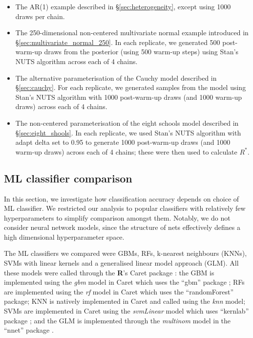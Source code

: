 \documentclass[ba]{imsart}
\numberwithin{equation}{section}
\theoremstyle{plain}
\begin{document}
\begin{supplement}
		\begin{itemize}
			\item The AR(1) example described in \S\ref{sec:heterogeneity}, except using 1000 draws per chain.
			\item The 250-dimensional non-centered multivariate normal example introduced in \S\ref{sec:multivariate_normal_250}. In each replicate, we generated 500 post-warm-up draws from the posterior (using 500 warm-up steps) using Stan's NUTS algorithm across each of 4 chains.
			\item The alternative parameterisation of the Cauchy model described in \S\ref{sec:cauchy}. For each replicate, we generated samples from the model using Stan's NUTS algorithm with 1000 post-warm-up draws (and 1000 warm-up draws) across each of 4 chains.
			\item The non-centered parameterisation of the eight schools model described in \S\ref{sec:eight_shools}. In each replicate, we used Stan's NUTS algorithm with adapt delta set to 0.95 to generate 1000 post-warm-up draws (and 1000 warm-up draws) across each of 4 chains; these were then used to calculate $R^*$.
		\end{itemize}
		
		\subsection{ML classifier comparison}\label{sec:ml_model}
		In this section, we investigate how classification accuracy depends on choice of ML classifier. We restricted our analysis to popular classifiers with relatively few hyperparameters to simplify comparison amongst them. Notably, we do not consider neural network models, since the structure of nets effectively defines a high dimensional hyperparameter space.
		
		The ML classifiers we compared were GBMs, RFs, k-nearest neighbours (KNNs), SVMs with linear kernels and a generalised linear model approach (GLM). All these models were called through the \textbf{\textsf{R}}'s Caret package \citep{kuhn2008building}: the GBM is implemented using the \textit{gbm} model in Caret which uses the ``gbm'' package \citep{greenwell2019package}; RFs are implemented using the \textit{rf} model in Caret which uses the ``randomForest'' \citep{liaw2002classification} package; KNN is natively implemented in Caret and called using the \textit{knn} model; SVMs are implemented in Caret using the \textit{svmLinear} model which uses ``kernlab'' package \citep{karatzoglou2004kernlab}; and the GLM is implemented through the \textit{multinom} model in the ``nnet'' package \citep{ripley2016package}.
		

\end{supplement}
\end{document}
